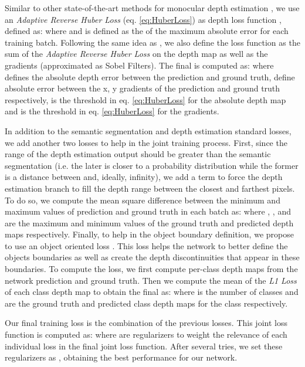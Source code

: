 \documentclass[letterpaper, 10 pt, conference]{ieeeconf}
\begin{document}
Similar to other state-of-the-art methods for monocular depth estimation \cite{pintore2021slicenet}\cite{wang2020bifuse}, we use an \textit{Adaptive Reverse Huber Loss} (eq. \ref{eq:HuberLoss}) as depth loss function , defined as:
\noindent
where  and  is defined as the  of the maximum absolute error for each training batch. Following the same idea as \cite{pintore2021slicenet}, we also define the loss function as the sum of the \textit{Adaptive Reverse Huber Loss} on the depth map as well as the gradients (approximated as Sobel Filters). The final  is computed as:
\noindent
where  defines the absolute depth error between the prediction and ground truth,  define absolute error between the x, y gradients of the prediction and ground truth respectively,  is the threshold in eq. \ref{eq:HuberLoss} for the absolute depth map and  is the threshold in eq. \ref{eq:HuberLoss} for the gradients.

In addition to the semantic segmentation and depth estimation standard losses, we add another two losses to help in the joint training process. First, since the range of the depth estimation output should be greater than the semantic segmentation (i.e. the later is closer to a probability distribution while the former is a distance between  and, ideally, infinity), we add a term to force the depth estimation branch to fill the depth range between the closest and farthest pixels. To do so, we compute the mean square difference between the minimum and maximum values of prediction and ground truth in each batch as:
\noindent
where , ,  and  are the maximum and minimum values of the ground truth and predicted depth maps respectively. 
Finally, to help in the object boundary definition, we propose to use an object oriented loss . This loss helps the network to better define the objects boundaries as well as create the depth discontinuities that appear in these boundaries. To compute the loss, we first compute per-class depth maps from the network prediction and ground truth. Then we compute the mean of the \textit{L1 Loss} of each class depth map to obtain the final  as:
\noindent
where  is the number of classes and  are the ground truth and predicted class depth maps for the class  respectively.

Our final training loss is the combination of the previous losses. This joint loss function is computed as:
 \noindent
where  are regularizers to weight the relevance of each individual loss in the final joint loss function. After several tries, we set these regularizers as , obtaining the best performance for our network.
\end{document}
